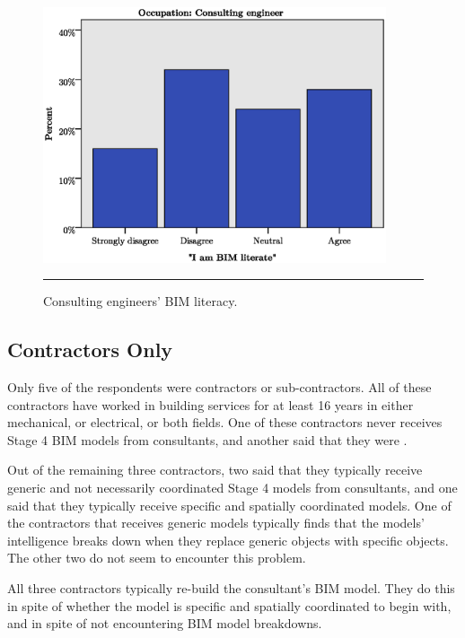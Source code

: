 \begin{figure}[htbp]
	\centering
	\includegraphics[width=0.9\textwidth]{figures/consultingXbimliteracy1.eps}
	\rule{0.9\textwidth}{0.5pt} %
	\caption{Consulting engineers' BIM literacy.}
	\label{consulting_X_bim_literacy}
\end{figure}



\subsection{Contractors Only}

Only five of the respondents were contractors or sub-contractors.
All of these contractors have worked in building services for at least 16 years in either mechanical, or electrical, or both fields.
One of these contractors never receives Stage 4 BIM models from consultants, and another said that they were .

Out of the remaining three contractors, two said that they typically receive generic and not necessarily coordinated Stage 4 models from consultants, and one said that they typically receive specific and spatially coordinated models.
One of the contractors that receives generic models typically finds that the models' intelligence breaks down when they replace generic objects with specific objects.
The other two do not seem to encounter this problem.

All three contractors typically re-build the consultant's BIM model.
They do this in spite of whether the model is specific and spatially coordinated to begin with, and in spite of not encountering BIM model breakdowns.


